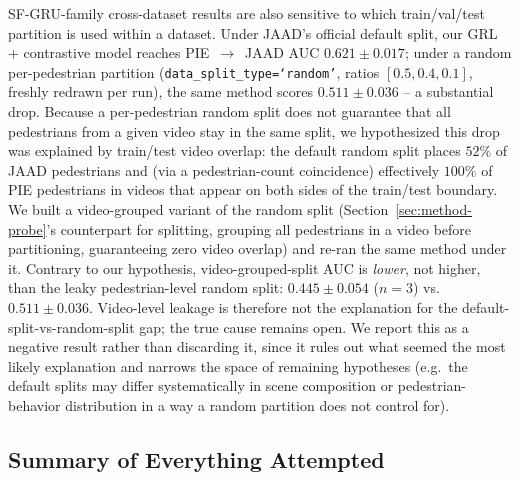 SF-GRU-family cross-dataset results are also sensitive to which
train/val/test partition is used within a dataset. Under JAAD's
official default split, our GRL + contrastive model reaches
PIE~$\to$~JAAD AUC $0.621\pm0.017$; under a random per-pedestrian
partition (\texttt{data\_split\_type=`random'}, ratios
$[0.5,0.4,0.1]$, freshly redrawn per run), the same method scores
$0.511\pm0.036$ -- a substantial drop. Because a per-pedestrian random
split does not guarantee that all pedestrians from a given video stay
in the same split, we hypothesized this drop was explained by
train/test video overlap: the default random split places $52\%$ of
JAAD pedestrians and (via a pedestrian-count coincidence) effectively
$100\%$ of PIE pedestrians in videos that appear on both sides of the
train/test boundary. We built a video-grouped variant of the random
split (Section~\ref{sec:method-probe}'s counterpart for splitting,
grouping all pedestrians in a video before partitioning, guaranteeing
zero video overlap) and re-ran the same method under it. Contrary to
our hypothesis, video-grouped-split AUC is \emph{lower}, not higher,
than the leaky pedestrian-level random split: $0.445\pm0.054$ ($n=3$)
vs.\ $0.511\pm0.036$. Video-level leakage is therefore not the
explanation for the default-split-vs-random-split gap; the true cause
remains open. We report this as a negative result rather than
discarding it, since it rules out what seemed the most likely
explanation and narrows the space of remaining hypotheses (e.g.\ the
default splits may differ systematically in scene composition or
pedestrian-behavior distribution in a way a random partition does not
control for).

\subsection{Summary of Everything Attempted}
\label{sec:results-summary}

